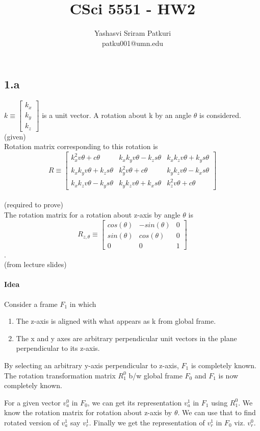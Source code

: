 \documentclass[12pt]{article}
\title{CSci 5551 - HW2}
\author{Yashasvi Sriram Patkuri\\patku001@umn.edu}
\newcommand{\fromlectures}{{\\ \color{blue} \hspace*{\fill}(from lecture slides)} \\}
\newcommand{\given}{{\\ \color{blue} \hspace*{\fill}(given)} \\}
\newcommand{\rtp}{{\\ \color{blue} \hspace*{\fill}(required to prove)} \\}
\newcommand{\rz}[1]{\begin{bmatrix} cos(#1) & -sin(#1) & 0 \\ sin(#1) & cos(#1) & 0 \\ 0 & 0 & 1 \end{bmatrix}}
\begin{document}
\maketitle
\pagebreak

\section{}
\subsection*{1.a}
$ k \equiv \begin{bmatrix} k_x \\ k_y \\ k_z \end{bmatrix} $ is a unit vector.
A rotation about k by an angle $\theta$ is considered.
\given

Rotation matrix corresponding to this rotation is
\[
  R \equiv
  \begin{bmatrix}
    k_x^2v\theta + c\theta & k_xk_yv\theta - k_zs\theta & k_xk_zv\theta + k_ys\theta\\
    k_xk_yv\theta + k_zs\theta & k_y^2v\theta + c\theta & k_yk_zv\theta - k_xs\theta \\
    k_xk_zv\theta - k_ys\theta & k_yk_zv\theta + k_xs\theta & k_z^2v\theta + c\theta
  \end{bmatrix}
\]
\rtp

The rotation matrix for a rotation about z-axis by angle $\theta$ is
\[
  R_{z,\theta} \equiv \rz{\theta}
\].
\fromlectures

\paragraph{Idea}
Consider a frame $ F_1 $ in which
\begin{enumerate}[nolistsep]
  \item The z-axis is aligned with what appears as k from global frame.
  \item The x and y axes are arbitrary perpendicular unit vectors in the plane perpendicular to its z-axis.
\end{enumerate}
By selecting an arbitrary y-axis perpendicular to z-axis, $ F_1 $ is completely known.
The rotation transformation matrix $ R_1^0 $ b/w global frame $ F_0 $ and $ F_1 $ is now completely known.

For a given vector $ v^0_a $ in $ F_0 $, we can get its representation $ v^1_a $ in $ F_1 $ using $ R_1^0 $.
We know the rotation matrix for rotation about z-axis by $\theta$.
We can use that to find rotated version of $ v^1_a $ say $ v^1_r $.
Finally we get the representation of $ v^1_r $ in $ F_0 $ viz. $ v^0_r $.
\end{document}
